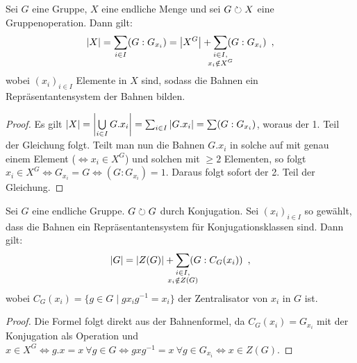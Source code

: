\documentclass[12pt,a4paper]{scrartcl}
\begin{document}
\begin{satz}[Bahnenformel] \label{thm:bahnformel}
	Sei $G$ eine Gruppe, $X$ eine endliche Menge und sei $G\operates X$ eine Gruppenoperation. Dann gilt: $$|X| = \sum_{i\in I}(G:G_{x_i}) = \abs*{X^G} + \sum_{\mathclap{\substack{i\in I,\\x_i\notin X^G}}}(G:G_{x_i})\enspace,$$ wobei $(x_i)_{i\in I}$ Elemente in $X$ sind, sodass die Bahnen ein Repräsentantensystem der Bahnen bilden.
\end{satz}

\begin{proof} Es gilt $|X| = \abs*{\bigcup\limits_{i\in I} G.x_i} = \sum_{i\in I}|G.x_i| = \sum (G:G_{x_i})$, woraus der 1. Teil der Gleichung folgt. Teilt man nun die Bahnen $G.x_i$ in solche auf mit genau einem Element ($\Leftrightarrow x_i\in X^G$) und solchen mit $\geq 2$ Elementen, so folgt $x_i\in X^G\Leftrightarrow G_{x_i} = G\Leftrightarrow (G:G_{x_i}) = 1$. Daraus folgt sofort der 2. Teil der Gleichung.
\end{proof}

\begin{satz}
	Sei $G$ eine endliche Gruppe. $G\operates G$ durch Konjugation. Sei $(x_i)_{i\in I}$ so gewählt, dass die Bahnen ein Repräsentantensystem für Konjugationsklassen sind. Dann gilt: \[ |G|  = |Z(G)| + \sum_{\mathclap{\substack{i\in I,\\x_i\notin Z(G)}}}(G: C_G(x_i))\enspace ,\] wobei $C_G(x_i) = \{g\in G\mid gx_ig^{-1} = x_i\}$ der Zentralisator von $x_i$ in $G$ ist.
\end{satz}

\begin{proof}
	Die Formel folgt direkt aus der Bahnenformel, da $C_G(x_i) = G_{x_i}$ mit der Konjugation als Operation und $x\in X^G\Leftrightarrow g.x = x~\forall g\in G\Leftrightarrow gxg^{-1} = x~\forall g\in G_{x_i}\Leftrightarrow x\in Z(G)$.
\end{proof}

\end{document}

